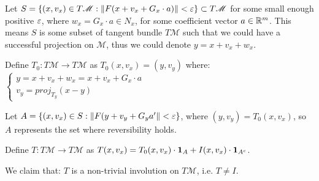 \documentclass{article}
\begin{document}
Let $S = \{(x, v_x) \in T\mathscr{M} : \left\lVert F(x + v_x + G_x \cdot a)\right\rVert < \varepsilon\} \subset T\mathscr{M}$ for some small enough positive $\varepsilon$, where $w_x = G_x \cdot a \in N_x$, for some coefficient vector $a \in \mathbb R^m$. This means $S$ is some subset of tangent bundle $T\mathscr{M}$ such that we could have a successful projection on $\mathscr{M}$, thus we could denote $y = x + v_x + w_x$. 

Define $T_0: T\mathscr{M} \to T\mathscr{M}$ as $T_0(x, v_x) = (y, v_y)$ 
where:
$\begin{cases}
y =  x + v_x + w_x = x + v_x + G_x \cdot a\\
v_y = \textit{proj}_{T_y}(x-y)
\end{cases}$

Let $A = \{(x, v_x) \in S : \left\lVert F(y + v_y + G_y a'\right\rVert < \varepsilon\}$, where $(y, v_y) = T_0(x, v_x)$, so $A$ represents the set where reversibility holds.

Define $T: T\mathscr{M} \to T\mathscr{M}$ as $T(x, v_x) = T_0(x, v_x) \cdot {\mathbf 1}_A + I(x, v_x) \cdot {\mathbf 1}_{A^c}$.

We claim that: $T$ is a non-trivial involution on $T\mathscr{M}$, i.e. $T \neq I$.
\end{document}
